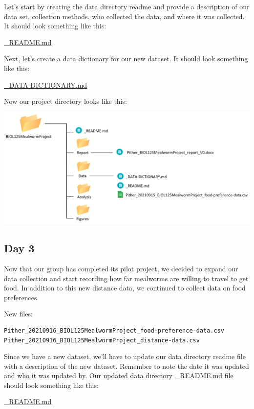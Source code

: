 \documentclass[
]{book}
\begin{document}
Let's start by creating the data directory readme and provide a description of our data set, collection methods, who collected the data, and where it was collected. It should look something like this:

\href{files/DS_biol-125-data-readme_V0.md}{\_README.md}

Next, let's create a data dictionary for our new dataset. It should look something like this:

\href{files/DS_biol-125-data-dictionary_V0.md}{\_DATA-DICTIONARY.md}

Now our project directory looks like this:

\includegraphics{images/DS_directory-example-2.png}

\hypertarget{day-3}{%
\subsection*{Day 3}\label{day-3}}

Now that our group has completed its pilot project, we decided to expand our data collection and start recording how far mealworms are willing to travel to get food. In addition to this new distance data, we continued to collect data on food preferences.

New files:

\begin{verbatim}
Pither_20210916_BIOL125MealwormProject_food-preference-data.csv
Pither_20210916_BIOL125MealwormProject_distance-data.csv
\end{verbatim}

Since we have a new dataset, we'll have to update our data directory readme file with a description of the new dataset. Remember to note the date it was updated and who it was updated by. Our updated data directory \_README.md file should look something like this:

\href{files/DS_biol-125-data-readme_V1.md}{\_README.md}
\end{document}
